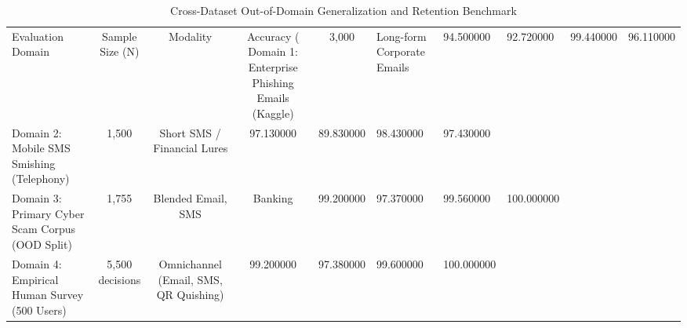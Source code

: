\begin{table}
\caption{Cross-Dataset Out-of-Domain Generalization and Retention Benchmark}
\label{tab:cross_dataset_generalization}
\begin{tabular}{lcccc}
\toprule
Evaluation Domain & Sample Size (N) & Modality & Accuracy (%
\midrule
Domain 1: Enterprise Phishing Emails (Kaggle) & 3,000 & Long-form Corporate Emails & 94.500000 & 92.720000 & 99.440000 & 96.110000 \\
Domain 2: Mobile SMS Smishing (Telephony) & 1,500 & Short SMS / Financial Lures & 97.130000 & 89.830000 & 98.430000 & 97.430000 \\
Domain 3: Primary Cyber Scam Corpus (OOD Split) & 1,755 & Blended Email, SMS & Banking & 99.200000 & 97.370000 & 99.560000 & 100.000000 \\
Domain 4: Empirical Human Survey (500 Users) & 5,500 decisions & Omnichannel (Email, SMS, QR Quishing) & 99.200000 & 97.380000 & 99.600000 & 100.000000 \\
\bottomrule
\end{tabular}
\end{table}
